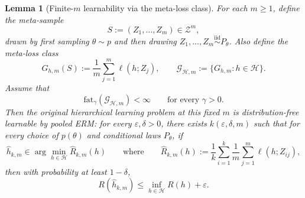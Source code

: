 \documentclass[11pt]{article}
\newtheorem{lemma}{Lemma}
\theoremstyle{definition}
\begin{document}
\begin{lemma}[Finite-$m$ learnability via the meta-loss class]
\label{lem:finite-m-reduction}
For each $m \ge 1$, define the meta-sample
\[
S := (Z_1,\dots,Z_m) \in \mathcal{Z}^m,
\]
drawn by first sampling $\theta \sim p$ and then drawing $Z_1,\dots,Z_m \overset{\mathrm{iid}}{\sim} P_{\theta}$. Also define the meta-loss class
\[
G_{h,m}(S) := \frac{1}{m}\sum_{j=1}^m \ell(h;Z_j),
\qquad
\mathcal{G}_{\mathcal{H},m} := \{G_{h,m} : h \in \mathcal{H}\}.
\]
Assume that
\[
\mathrm{fat}_{\gamma}(\mathcal{G}_{\mathcal{H},m}) < \infty
\qquad \text{for every } \gamma > 0.
\]
Then the original hierarchical learning problem at this fixed $m$ is distribution-free learnable by pooled ERM: for every $\varepsilon,\delta > 0$, there exists $k(\varepsilon,\delta,m)$ such that for every choice of $p(\theta)$ and conditional laws $P_{\theta}$, if
\[
\widehat{h}_{k,m}
\in
\arg\min_{h \in \mathcal{H}} \widehat{R}_{k,m}(h)
\qquad\text{where}\qquad
\widehat{R}_{k,m}(h)
:=
\frac{1}{k}\sum_{i=1}^k \frac{1}{m}\sum_{j=1}^m \ell(h;Z_{ij}),
\]
then with probability at least $1-\delta$,
\[
R(\widehat{h}_{k,m})
\le
\inf_{h \in \mathcal{H}} R(h) + \varepsilon.
\]
\end{lemma}
\end{document}
